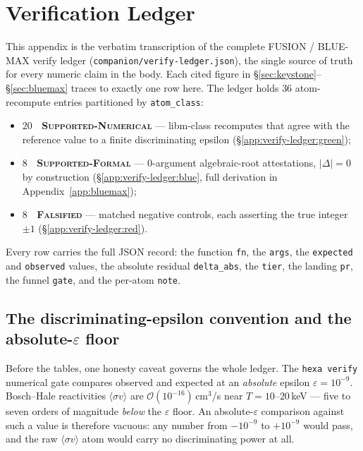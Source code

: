 \section{Verification Ledger}
\label{app:verify-ledger}

This appendix is the verbatim transcription of the complete FUSION /
BLUE-MAX verify ledger (\texttt{companion/\allowbreak verify-ledger.json}),
the single source of truth for every numeric claim in the body. Each
cited figure in \S\ref{sec:keystone}--\S\ref{sec:bluemax} traces to
exactly one row here. The ledger holds $36$ atom-recompute entries
partitioned by \texttt{atom\_class}:
\begin{itemize}
  \item \textbf{$20$ \tierGreen\ \textsc{Supported-Numerical}} --- libm-class
        recomputes that agree with the reference value to a finite
        discriminating epsilon (\S\ref{app:verify-ledger:green});
  \item \textbf{$8$ \tierBlue\ \textsc{Supported-Formal}} --- $0$-argument
        algebraic-root attestations, $|\Delta|=0$ by construction
        (\S\ref{app:verify-ledger:blue}, full derivation in
        Appendix~\ref{app:bluemax});
  \item \textbf{$8$ \tierRed\ \textsc{Falsified}} --- matched negative
        controls, each asserting the true integer $\pm1$
        (\S\ref{app:verify-ledger:red}).
\end{itemize}
Every row carries the full JSON record: the function \texttt{fn}, the
\texttt{args}, the \texttt{expected} and \texttt{observed} values, the
absolute residual \texttt{delta\_abs}, the \texttt{tier}, the landing
\texttt{pr}, the funnel \texttt{gate}, and the per-atom \texttt{note}.

\subsection{The discriminating-epsilon convention and the absolute-$\varepsilon$ floor}
\label{app:verify-ledger:epsilon}

Before the tables, one honesty caveat governs the whole ledger. The
\texttt{hexa verify} numerical gate compares observed and expected at an
\emph{absolute} epsilon $\varepsilon=10^{-9}$. Bosch--Hale reactivities
$\langle\sigma v\rangle$ are $\mathcal{O}(10^{-16})$\,cm$^3$/s near
$T=10$--$20$\,keV --- five to seven orders of magnitude \emph{below} the
$\varepsilon$ floor. An absolute-$\varepsilon$ comparison against such a
value is therefore vacuous: any number from $-10^{-9}$ to $+10^{-9}$
would pass, and the raw $\langle\sigma v\rangle$ atom would carry no
discriminating power at all.


